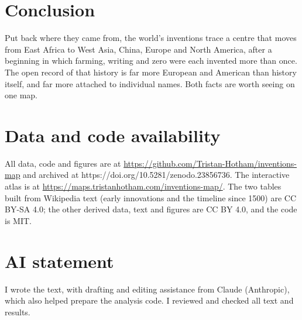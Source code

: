 \documentclass[11pt,a4paper]{article}
\begin{document}
\section{Conclusion}
Put back where they came from, the world's inventions trace a centre that moves from East Africa to West Asia, China, Europe and North America, after a beginning in which farming, writing and zero were each invented more than once. The open record of that history is far more European and American than history itself, and far more attached to individual names. Both facts are worth seeing on one map.

\section*{Data and code availability}
All data, code and figures are at \url{https://github.com/Tristan-Hotham/inventions-map} and archived at https://doi.org/10.5281/zenodo.23856736. The interactive atlas is at \url{https://maps.tristanhotham.com/inventions-map/}. The two tables built from Wikipedia text (early innovations and the timeline since 1500) are CC BY-SA 4.0; the other derived data, text and figures are CC BY 4.0, and the code is MIT.

\section*{AI statement}
I wrote the text, with drafting and editing assistance from Claude (Anthropic), which also helped prepare the analysis code. I reviewed and checked all text and results.
\end{document}
